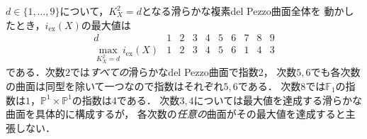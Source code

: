 \documentclass[11pt,a4paper]{ltjsarticle}
\begin{document}
\begin{theorem}
\label{thm:delpezzo-exact-index-table}
$d\in\{1,\ldots,9\}$について，$K_X^2=d$となる滑らかな複素del Pezzo曲面全体を
動かしたとき，$i_{\mathrm{ex}}(X)$の最大値は
\[
\begin{array}{c|ccccccccc}
 d&1&2&3&4&5&6&7&8&9\\\hline
 \max_{K_X^2=d} i_{\mathrm{ex}}(X)&1&2&3&4&5&6&1&4&3
\end{array}
\]
である．次数$2$では\emph{すべての}滑らかなdel Pezzo曲面で指数$2$，
次数$5,6$でも各次数の曲面は同型を除いて一つなので指数はそれぞれ$5,6$である．
次数$8$では$\mathbb F_1$の指数は$1$，$\mathbb P^1\times\mathbb P^1$の指数は$4$である．
次数$3,4$については最大値を達成する滑らかな曲面を具体的に構成するが，
各次数の\emph{任意の}曲面がその最大値を達成すると主張しない．
\end{theorem}
\end{document}
